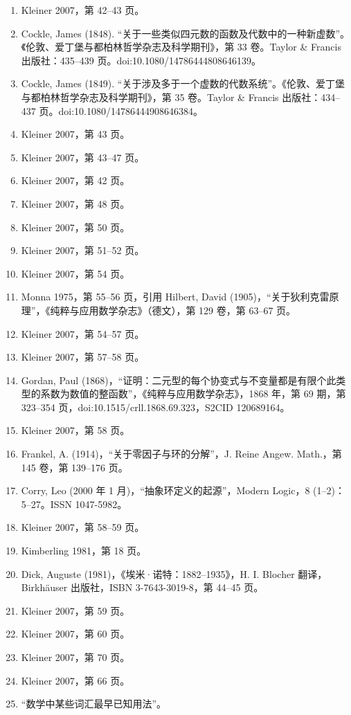 \begin{enumerate}
\item Kleiner 2007，第 42–43 页。
\item Cockle, James (1848). “关于一些类似四元数的函数及代数中的一种新虚数”。《伦敦、爱丁堡与都柏林哲学杂志及科学期刊》，第 33 卷。Taylor & Francis 出版社：435–439 页。doi:10.1080/14786444808646139。
\item Cockle, James (1849). “关于涉及多于一个虚数的代数系统”。《伦敦、爱丁堡与都柏林哲学杂志及科学期刊》，第 35 卷。Taylor & Francis 出版社：434–437 页。doi:10.1080/14786444908646384。
\item Kleiner 2007，第 43 页。
\item Kleiner 2007，第 43–47 页。
\item Kleiner 2007，第 42 页。
\item Kleiner 2007，第 48 页。
\item Kleiner 2007，第 50 页。
\item Kleiner 2007，第 51–52 页。
\item Kleiner 2007，第 54 页。
\item Monna 1975，第 55–56 页，引用 Hilbert, David (1905)，“关于狄利克雷原理”，《纯粹与应用数学杂志》（德文），第 129 卷，第 63–67 页。
\item Kleiner 2007，第 54–57 页。
\item Kleiner 2007，第 57–58 页。
\item Gordan, Paul (1868)，“证明：二元型的每个协变式与不变量都是有限个此类型的系数为数值的整函数”，《纯粹与应用数学杂志》，1868 年，第 69 期，第 323–354 页，doi:10.1515/crll.1868.69.323，S2CID 120689164。
\item Kleiner 2007，第 58 页。
\item  Frankel, A. (1914)，“关于零因子与环的分解”，J. Reine Angew. Math.，第 145 卷，第 139–176 页。
\item Corry, Leo (2000 年 1 月)，“抽象环定义的起源”，Modern Logic，8 (1–2)：5–27。ISSN 1047-5982。
\item Kleiner 2007，第 58–59 页。
\item Kimberling 1981，第 18 页。
\item Dick, Auguste (1981)，《埃米·诺特：1882–1935》，H. I. Blocher 翻译，Birkhäuser 出版社，ISBN 3-7643-3019-8，第 44–45 页。
\item Kleiner 2007，第 59 页。
\item Kleiner 2007，第 60 页。
\item Kleiner 2007，第 70 页。
\item Kleiner 2007，第 66 页。
\item “数学中某些词汇最早已知用法”。

\end{enumerate}
